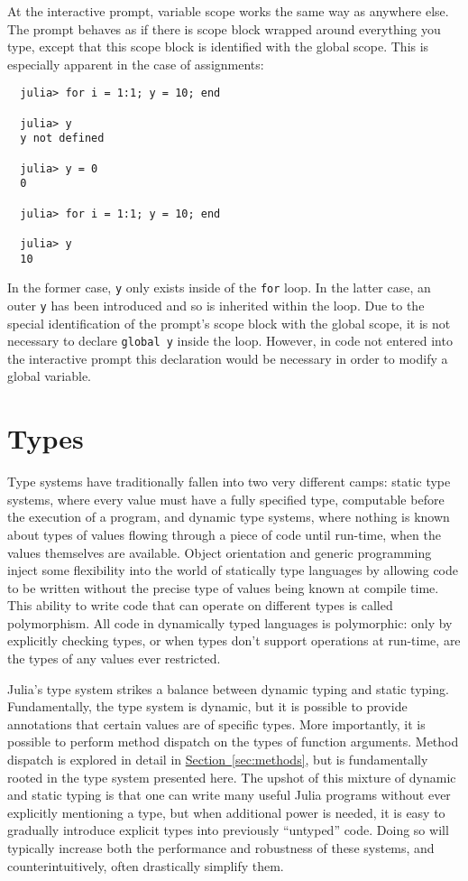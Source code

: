 \documentclass{article}
\renewcommand{\sec}[1]{\label{sec:#1}}
\newcommand{\Section}[1]{\hyperref[sec:#1]{Section~\ref*{sec:#1}}}
\begin{document}
At the interactive prompt, variable scope works the same way as anywhere
else. The prompt behaves as if there is scope block wrapped around everything
you type, except that this scope block is identified with the global scope.
This is especially apparent in the case of assignments:
\begin{verbatim}
  julia> for i = 1:1; y = 10; end
  
  julia> y
  y not defined
  
  julia> y = 0
  0
  
  julia> for i = 1:1; y = 10; end
  
  julia> y
  10
\end{verbatim}
In the former case, \verb|y| only exists inside of the \verb|for| loop.
In the latter case, an outer \verb|y| has been introduced and so is inherited
within the loop. Due to the special identification of the prompt's scope
block with the global scope, it is not necessary to declare
\verb|global y| inside the loop. However, in code not entered into the interactive prompt
this declaration would be necessary in order to modify a global variable.

\section{Types}\sec{types}

Type systems have traditionally fallen into two very different camps:
static type systems, where every value must have a fully specified type, computable before the execution of a program, and dynamic type systems, where nothing is known about types of values flowing through a piece of code until run-time, when the values themselves are available.
Object orientation and generic programming inject some flexibility into the world of statically type languages by allowing code to be written without the precise type of values being known at compile time.
This ability to write code that can operate on different types is called polymorphism.
All code in dynamically typed languages is polymorphic:
only by explicitly checking types, or when types don't support operations at run-time, are the types of any values ever restricted.

Julia's type system strikes a balance between dynamic typing and static typing.
Fundamentally, the type system is dynamic, but it is possible to provide annotations that certain values are of specific types.
More importantly, it is possible to perform method dispatch on the types of function arguments.
Method dispatch is explored in detail in \Section{methods}, but is fundamentally rooted in the type system presented here.
The upshot of this mixture of dynamic and static typing is that one can write many useful Julia programs without ever explicitly mentioning a type, but when additional power is needed, it is easy to gradually introduce explicit types into previously ``untyped'' code.
Doing so will typically increase both the performance and robustness of these systems, and counterintuitively, often drastically simplify them.
\end{document}
